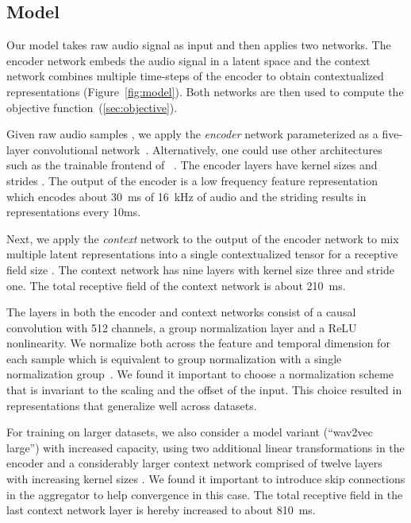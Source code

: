 \documentclass{article} \pdfoutput=1
\newcommand{\wav}{wav2vec}
\begin{document}
\subsection{Model}
\label{sec:model}

Our model takes raw audio signal as input and then applies two networks. 
The encoder network embeds the audio signal in a latent space and the context network combines multiple time-steps of the encoder to obtain contextualized representations (Figure~\ref{fig:model}). 
Both networks are then used to compute the objective function~(\textsection\ref{sec:objective}).

Given raw audio samples , we apply the \emph{encoder} network  parameterized as a five-layer convolutional network~\citep{oord2018cpc}.
Alternatively, one could use other architectures such as the trainable frontend of ~\citet{zeghidour2018filters}.
The encoder layers have kernel sizes  and strides .
The output of the encoder is a low frequency feature representation  which encodes about \SI{30}{\ms} of \SI{16}{\kHz} of audio and the striding results in representations  every 10ms.

Next, we apply the \emph{context} network  to the output of the encoder network to mix multiple latent representations  into a single contextualized tensor  for a receptive field size .
The context network has nine layers with kernel size three and stride one.
The total receptive field of the context network is about \SI{210}{\ms}.

The layers in both the encoder and context networks consist of a causal convolution with 512 channels, a group normalization layer and a ReLU nonlinearity.
We normalize both across the feature and temporal dimension for each sample which is equivalent to group normalization with a single normalization group~\citep{wu2018gn}.
We found it important to choose a normalization scheme that is invariant to the scaling and the offset of the input.
This choice resulted in representations that generalize well across datasets.

For training on larger datasets, we also consider a model variant (``\wav{} large'') with increased capacity, using two additional linear transformations in the encoder and a considerably larger context network comprised of twelve layers with increasing kernel sizes .
We found it important to introduce skip connections in the aggregator to help convergence in this case.
The total receptive field in the last context network layer is hereby increased to about \SI{810}{\ms}.
\end{document}
